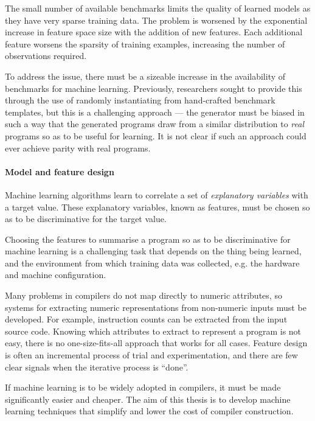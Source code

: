 The small number of available benchmarks limits the quality of learned models as they have very sparse training data. The problem is worsened by the exponential increase in feature space size with the addition of new features. Each additional feature worsens the sparsity of training examples, increasing the number of observations required.

To address the issue, there must be a sizeable increase in the availability of benchmarks for machine learning. Previously, researchers sought to provide this through the use of randomly instantiating from hand-crafted benchmark templates, but this is a challenging approach --- the generator must be biased in such a way that the generated programs draw from a similar distribution to \emph{real} programs so as to be useful for learning. It is not clear if such an approach could ever achieve parity with real programs.

\paragraph*{Model and feature design} Machine learning algorithms learn to correlate a set of \emph{explanatory variables} with a target value. These explanatory variables, known as features, must be chosen so as to be discriminative for the target value.

Choosing the features to summarise a program so as to be discriminative for machine learning is a challenging task that depends on the thing being learned, and the environment from which training data was collected, e.g. the hardware and machine configuration.

Many problems in compilers do not map directly to numeric attributes, so systems for extracting numeric representations from non-numeric inputs must be developed. For example, instruction counts can be extracted from the input source code. Knowing which attributes to extract to represent a program is not easy, there is no one-size-fits-all approach that works for all cases. Feature design is often an incremental process of trial and experimentation, and there are few clear signals when the iterative process is ``done''.

If machine learning is to be widely adopted in compilers, it must be made significantly easier and cheaper. The aim of this thesis is to develop machine learning techniques that simplify and lower the cost of compiler construction.




